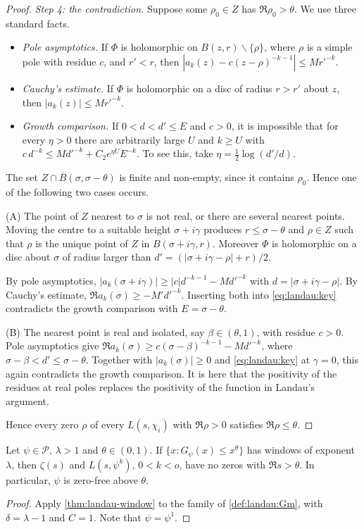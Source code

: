 \begin{proof}
\emph{Step 4: the contradiction.} Suppose some $\rho_0\in Z$ has $\Re\rho_0>\theta$. We use three
standard facts.
\begin{itemize}
\item \emph{Pole asymptotics.} If $\Phi$ is holomorphic on $B(z,r)\smallsetminus\{\rho\}$, where $\rho$
is a simple pole with residue $c$, and $r'<r$, then $|a_k(z)-c(z-\rho)^{-k-1}|\le M r'^{-k}$.
\item \emph{Cauchy's estimate.} If $\Phi$ is holomorphic on a disc of radius $r>r'$ about $z$, then
$|a_k(z)|\le Mr'^{-k}$.
\item \emph{Growth comparison.} If $0<d<d'\le E$ and $c>0$, it is impossible that for every $\eta>0$
there are arbitrarily large $U$ and $k\ge U$ with $c\,d^{-k}\le M{d'}^{-k}+C_2e^{\eta U}E^{-k}$. To see
this, take $\eta=\frac12\log(d'/d)$.
\end{itemize}
The set $Z\cap\overline B(\sigma,\sigma-\theta)$ is finite and non-empty, since it contains $\rho_0$.
Hence one of the following two cases occurs.

(A) The point of $Z$ nearest to $\sigma$ is not real, or there are several nearest points. Moving
the centre to a suitable height $\sigma+i\gamma$ produces $r\le\sigma-\theta$ and $\rho\in Z$ such
that $\rho$ is the unique point of $Z$ in $B(\sigma+i\gamma,r)$. Moreover $\Phi$ is holomorphic on a
disc about $\sigma$ of radius larger than $d'=(|\sigma+i\gamma-\rho|+r)/2$.

By pole asymptotics, $|a_k(\sigma+i\gamma)|\ge|c|d^{-k-1}-Md'^{-k}$ with $d=|\sigma+i\gamma-\rho|$.
By Cauchy's estimate, $\Re a_k(\sigma)\ge-M'd'^{-k}$. Inserting both into \eqref{eq:landau:key}
contradicts the growth comparison with $E=\sigma-\theta$.

(B) The nearest point is real and isolated, say $\beta\in(\theta,1)$, with residue $c>0$. Pole
asymptotics give $\Re a_k(\sigma)\ge c(\sigma-\beta)^{-k-1}-Md'^{-k}$, where
$\sigma-\beta<d'\le\sigma-\theta$. Together with $|a_k(\sigma)|\ge0$ and \eqref{eq:landau:key} at
$\gamma=0$, this again contradicts the growth comparison. It is here that the positivity of the
residues at real poles replaces the positivity of the function in Landau's argument.

Hence every zero $\rho$ of every $L(s,\chi_i)$ with $\Re\rho>0$ satisfies $\Re\rho\le\theta$.
\end{proof}

\begin{corollary}\label{cor:landau:formB}
Let $\psi\in\mathcal P$, $\lambda>1$ and $\theta\in(0,1)$. If $\{x:G_\psi(x)\le x^\theta\}$ has
windows of exponent $\lambda$, then $\zeta(s)$ and $L(s,\psi^k)$, $0<k<o$, have no zeros with
$\Re s>\theta$. In particular, $\psi$ is zero-free above $\theta$.
\end{corollary}

\begin{proof}
Apply \cref{thm:landau-window} to the family of \cref{def:landau:Gm}, with $\delta=\lambda-1$ and
$C=1$. Note that $\psi=\psi^1$.
\end{proof}
